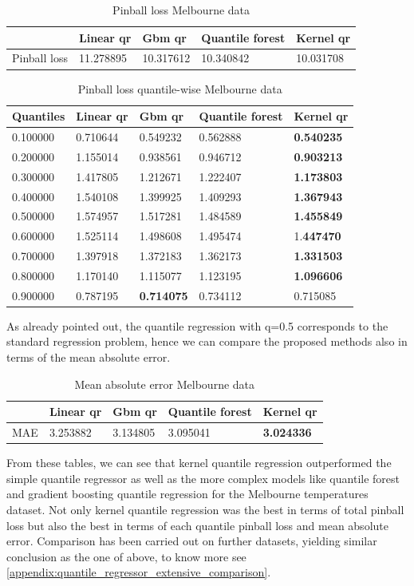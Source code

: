 \begin{table}[!h]
\caption{Pinball loss Melbourne data}
\begin{tabular}{lllll}
    \toprule
     & Linear qr & Gbm qr & Quantile forest & Kernel qr \\
    \midrule
    Pinball loss & 11.278895 & 10.317612 & 10.340842 & 10.031708 \\
    \bottomrule
    \end{tabular}
\end{table}

\begin{table}[!h]
    \caption{Pinball loss quantile-wise Melbourne data}
    \begin{tabular}{lllll}
    \toprule
    Quantiles & Linear qr & Gbm qr & Quantile forest & Kernel qr \\
    \midrule
    0.100000 & 0.710644 & 0.549232 & 0.562888 & \textbf{0.540235} \\
    0.200000 & 1.155014 & 0.938561 & 0.946712 & \textbf{0.903213} \\
    0.300000 & 1.417805 & 1.212671 & 1.222407 & \textbf{1.173803} \\
    0.400000 & 1.540108 & 1.399925 & 1.409293 & \textbf{1.367943} \\
    0.500000 & 1.574957 & 1.517281 & 1.484589 & \textbf{1.455849} \\
    0.600000 & 1.525114 & 1.498608 & 1.495474 & 1.\textbf{447470} \\
    0.700000 & 1.397918 & 1.372183 & 1.362173 & \textbf{1.331503} \\
    0.800000 & 1.170140 & 1.115077 & 1.123195 & \textbf{1.096606} \\
    0.900000 & 0.787195 & \textbf{0.714075} & 0.734112 & 0.715085 \\
    \bottomrule
    \end{tabular}
\end{table}
As already pointed out, the quantile regression with q=0.5 corresponds to the standard regression problem, hence we can compare the proposed methods also in terms of the mean absolute error.
\begin{table}[!h]
\caption{Mean absolute error Melbourne data}
\begin{tabular}{lllll}
    \toprule
     & Linear qr & Gbm qr & Quantile forest & Kernel qr \\
    \midrule
    MAE & 3.253882 & 3.134805 & 3.095041 & \textbf{3.024336} \\
    \bottomrule
    \end{tabular}
\end{table}  
From these tables, we can see that kernel quantile regression outperformed the simple quantile regressor as well as the more complex models like quantile forest and gradient boosting quantile regression for the Melbourne temperatures dataset. Not only kernel quantile regression was the best in terms of total pinball loss but also the best in terms of each quantile pinball loss and mean absolute error.
Comparison has been carried out on further datasets, yielding similar conclusion as the one of above, to know more see \ref{appendix:quantile_regressor_extensive_comparison}.

